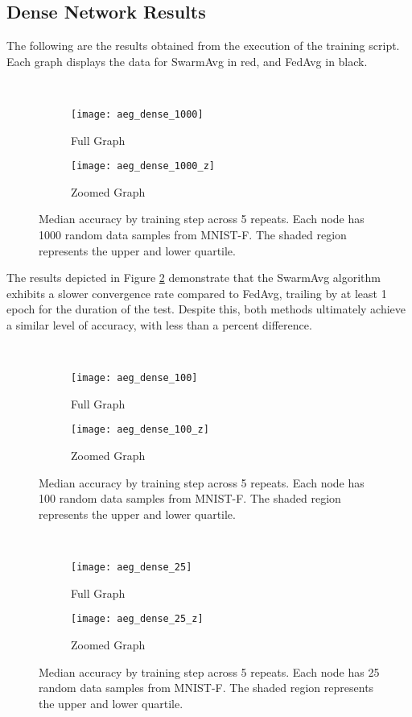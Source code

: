 \subsection{Dense Network Results}
The following are the results obtained from the execution of the training script. Each graph displays the data for SwarmAvg in red, and FedAvg in black.

\begin{figure}[H] 
	 \\
	\begin{subfigure}{0.49\textwidth}
		\texttt{[image: aeg\_dense\_1000]}
		\caption{Full Graph}
	\end{subfigure}
	\begin{subfigure}{0.49\textwidth}
		\texttt{[image: aeg\_dense\_1000\_z]}
		\caption{Zoomed Graph}
	\end{subfigure}
	\caption{Median accuracy by training step across 5 repeats. Each node has 1000 random data samples from MNIST-F. The shaded region represents the upper and lower quartile.}
	\label{aeg1}
\end{figure}

The results depicted in Figure \ref{aeg2} demonstrate that the SwarmAvg algorithm exhibits a slower convergence rate compared to FedAvg, trailing by at least 1 epoch for the duration of the test. Despite this, both methods ultimately achieve a similar level of accuracy, with less than a percent difference.

\begin{figure}[H] 
	 \\
	\begin{subfigure}{0.49\textwidth}
		\texttt{[image: aeg\_dense\_100]}
		\caption{Full Graph}
	\end{subfigure}
	\begin{subfigure}{0.49\textwidth}
		\texttt{[image: aeg\_dense\_100\_z]}
		\caption{Zoomed Graph}
	\end{subfigure}
	\caption{Median accuracy by training step across 5 repeats. Each node has 100 random data samples from MNIST-F. The shaded region represents the upper and lower quartile.}
	\label{aeg2}
\end{figure}


\begin{figure}[H] 
	 \\
	\begin{subfigure}{0.49\textwidth}
		\texttt{[image: aeg\_dense\_25]}
		\caption{Full Graph}
	\end{subfigure}
	\begin{subfigure}{0.49\textwidth}
		\texttt{[image: aeg\_dense\_25\_z]}
		\caption{Zoomed Graph}
	\end{subfigure}
	\caption{Median accuracy by training step across 5 repeats. Each node has 25 random data samples from MNIST-F. The shaded region represents the upper and lower quartile.}
	\label{aeg3}
\end{figure}

